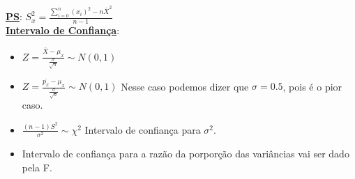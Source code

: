 \documentclass[12pt, oneside]{article}
\newcommand{\mytitle}[1]{\textbf{\underline{#1}}}
\newcommand{\gsum}[3]{\displaystyle\sum_{#1}^#2 #3}
\begin{document}
\mytitle{PS}: $S_x^2=\frac{\gsum{i=0}{n}{(x_i)^2}-n\bar{X}^2}{n-1}$\\
\mytitle{Intervalo de Confiança}:\\
\begin{itemize}
\item $Z=\frac{\bar{X}-\mu_x}{\frac{\sigma}{\sqrt{n}}}\sim N(0,1)$
\item $Z=\frac{\bar{p_x}-\mu_x}{\frac{\sigma}{\sqrt{n}}}\sim N(0,1)$ Nesse caso podemos dizer que $\sigma=0.5$, pois é o pior caso.
\item $\frac{(n-1)S^2}{\sigma^2}\sim \chi^2$ Intervalo de confiança para $\sigma^2$.
\item Intervalo de confiança para a razão da porporção das variâncias vai ser dado pela F.
\end{itemize}
\end{document}
